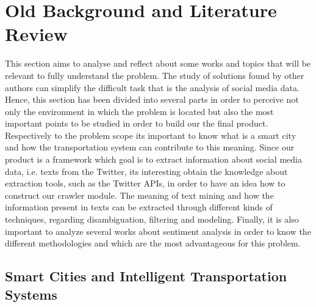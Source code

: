 

\chapter{Old Background and Literature Review} \label{chap:sota}

\minitoc \mtcskip \noindent

This section aims to analyse and reflect about some works and topics that will be relevant to fully understand the problem. The study of solutions found by other authors can simplify the difficult task that is the analysis of social media data.
Hence, this section has been divided into several parts in order to perceive not only the environment in which the problem is located but also the most important points to be studied in order to build our the final product. Respectively to the problem scope its important to know what is a smart city and how the transportation system can contribute to this meaning. Since our product is a framework which goal is to extract information about social media data, i.e. texts from the Twitter, its interesting obtain the knowledge about extraction tools, such as the Twitter APIs, in order to have an idea how to construct our crawler module. The meaning of text mining and how the information present in texts can be extracted through different kinds of techniques, regarding disambiguation, filtering and modeling. Finally, it is also important to analyze several works about sentiment analysis in order to know the different methodologies and which are the most advantageous for this problem.

\section{Smart Cities and Intelligent Transportation Systems}\label{sec:smartcities}

